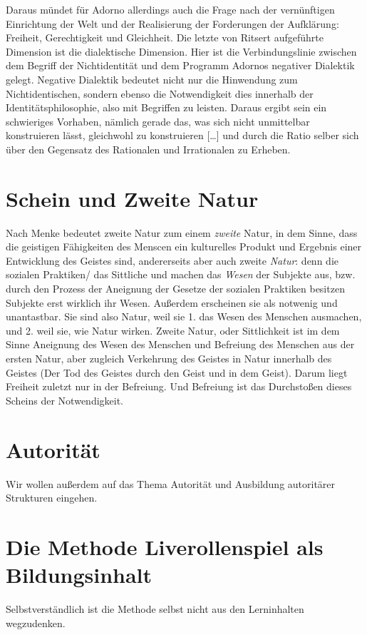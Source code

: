 \documentclass[12pt, a4paper, openany]{report}
\begin{document}
Daraus mündet für Adorno allerdings auch die Frage nach der vernünftigen Einrichtung der Welt und der Realisierung der Forderungen der Aufklärung: Freiheit, Gerechtigkeit und Gleichheit. 
Die letzte von Ritsert aufgeführte Dimension ist die dialektische Dimension. Hier ist die Verbindungslinie zwischen dem Begriff der Nichtidentität und dem Programm Adornos negativer Dialektik gelegt. 
Negative Dialektik bedeutet nicht nur die Hinwendung zum Nichtidentischen, sondern ebenso die Notwendigkeit dies innerhalb der Identitätsphilosophie, also mit Begriffen zu leisten. 
Daraus ergibt sein ein schwieriges Vorhaben, \glqq nämlich gerade das, was sich nicht unmittelbar konstruieren lässt, gleichwohl zu konstruieren […] und durch die Ratio selber sich über den Gegensatz des Rationalen und Irrationalen zu Erheben\grqq.

\section{Schein und Zweite Natur} \label{zweite-natur}
Nach Menke bedeutet zweite Natur zum einem \textit{zweite} Natur, in dem Sinne, dass die geistigen Fähigkeiten des Menscen ein kulturelles Produkt und Ergebnis einer Entwicklung des Geistes sind, andererseits aber auch zweite \textit{Natur}: 
denn die sozialen Praktiken/ das Sittliche und machen das \textit{Wesen} der Subjekte aus, bzw. durch den Prozess der Aneignung der Gesetze der sozialen Praktiken besitzen Subjekte erst wirklich ihr Wesen.
Außerdem erscheinen sie als notwenig und unantastbar. 
Sie sind also Natur, weil sie 1. das Wesen des Menschen ausmachen, und 2. weil sie, wie Natur wirken.
Zweite Natur, oder Sittlichkeit ist im dem Sinne Aneignung des Wesen des Menschen und Befreiung des Menschen aus der ersten Natur, aber zugleich Verkehrung des Geistes in Natur innerhalb des Geistes (Der Tod des Geistes durch den Geist und in dem Geist).
Darum liegt Freiheit zuletzt nur in der Befreiung. Und Befreiung ist das Durchstoßen dieses Scheins der Notwendigkeit.

\section{Autorität}
Wir wollen außerdem auf das Thema Autorität und Ausbildung autoritärer Strukturen eingehen.

\section{Die Methode Liverollenspiel als Bildungsinhalt}
Selbstverständlich ist die Methode selbst nicht aus den Lerninhalten wegzudenken.
\end{document}
